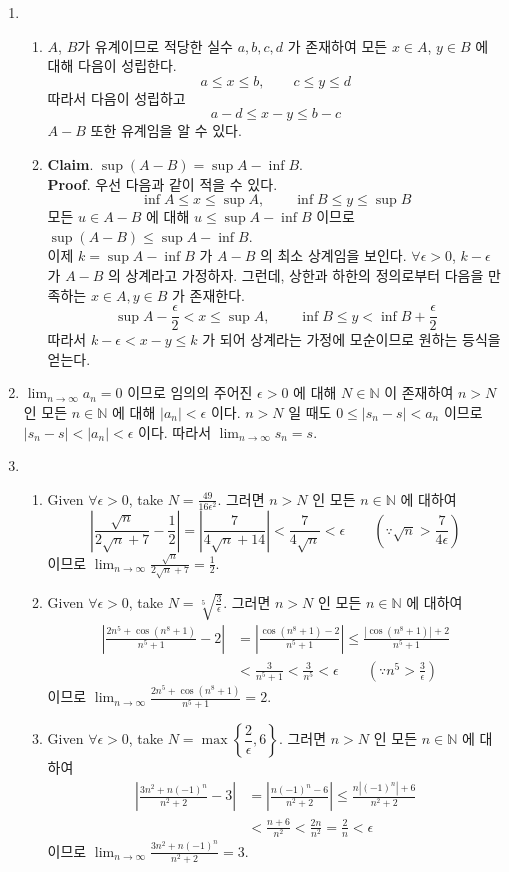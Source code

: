 \documentclass[12pt]{report}
\newcommand{\numl}[1]{\item[\large\textbf{\sffamily #1.}]}
\newcommand{\num}[1]{\item[\textbf{\sffamily #1}]}
\newcommand{\bb}[1]{\mathbb{#1}}
\newcommand{\ra}{\rightarrow}
\newcommand{\abs}[1]{\left|#1\right|}
\newcommand{\ds}{\displaystyle}
\begin{document}
\begin{enumerate}
\numl{3}
\begin{enumerate}
	\num{(1)} $A$, $B$가 유계이므로 적당한 실수 $a, b, c, d$ 가 존재하여 모든 $x \in A$, $y\in B$ 에 대해 다음이 성립한다. $$a\leq x\leq b, \qquad c\leq y\leq d$$ 따라서 다음이 성립하고 $$a-d\leq x-y\leq b-c$$ $A-B$ 또한 유계임을 알 수 있다.
	\num{(2)} \textbf{Claim}. $\sup(A-B) = \sup A-\inf B$.\\ \textbf{Proof}. 우선 다음과 같이 적을 수 있다. $$\inf A\leq x\leq \sup A, \qquad \inf B\leq y\leq \sup B$$ 모든 $u \in A-B$ 에 대해 $u \leq \sup A - \inf B$ 이므로 $\sup(A-B) \leq \sup A - \inf B$.\\ 이제 $k = \sup A - \inf B$ 가 $A-B$ 의 최소 상계임을 보인다. $\forall \epsilon > 0$, $k - \epsilon$ 가 $A-B$ 의 상계라고 가정하자. 그런데, 상한과 하한의 정의로부터 다음을 만족하는 $x \in A, y \in B$ 가 존재한다. $$\sup A - \frac{\epsilon}{2} < x \leq \sup A, \qquad \inf B \leq y < \inf B + \frac{\epsilon}{2}$$ 따라서 $k - \epsilon < x-y \leq k$ 가 되어 상계라는 가정에 모순이므로 원하는 등식을 얻는다.
\end{enumerate}

\numl{4} $\ds \lim_{n \ra \infty} a_n = 0$ 이므로 임의의 주어진 $\epsilon > 0$ 에 대해 $N\in\bb{N}$ 이 존재하여 $n>N$ 인 모든 $n\in \bb{N}$ 에 대해 $\abs{a_n} < \epsilon$ 이다. $n>N$ 일 때도 $0\leq\abs{s_n-s} < a_n$ 이므로 $\abs{s_n-s} < \abs{a_n} <\epsilon$ 이다. 따라서 $\ds \lim_{n \ra \infty} s_n = s$.

\numl{5}
\begin{enumerate}
	\num{(1)} Given $\forall \epsilon > 0$, take $N = \ds \frac{49}{16\epsilon^2}$. 그러면 $n>N$ 인 모든 $n\in\bb{N}$ 에 대하여\\
	$$\abs{\frac{\sqrt{n}}{2\sqrt{n}+7} - \frac{1}{2}} = \abs{\frac{7}{4\sqrt{n}+14}} < \frac{7}{4\sqrt{n}} < \epsilon \qquad \left(\because \sqrt{n} > \frac{7}{4\epsilon}\right)$$
	이므로 $\ds \lim_{n \ra \infty} \frac{\sqrt{n}}{2\sqrt{n}+7} = \frac{1}{2}$.
	
	\num{(2)} Given $\forall \epsilon > 0$, take $N = \ds \sqrt[5]{\frac{3}{\epsilon}}$. 그러면 $n>N$ 인 모든 $n\in\bb{N}$ 에 대하여\\
	$$\begin{aligned}
		\abs{\frac{2n^5 +\cos(n^8 +1)}{n^5+1} - 2} &= \abs{\frac{\cos(n^8+1) - 2}{n^5+1}} \leq \frac{\abs{\cos(n^8+1)} + 2}{n^5+1} \\&< \frac{3}{n^5+1} < \frac{3}{n^5} < \epsilon \qquad \left(\because n^5 > \frac{3}{\epsilon}\right)
	\end{aligned}$$
	이므로 $\ds \lim_{n \ra \infty} \frac{2n^5 +\cos(n^8 +1)}{n^5+1} = 2$.
	\num{(3)} Given $\forall \epsilon > 0$, take $N = \max\left\{\dfrac{2}{\epsilon}, 6\right\}$. 그러면 $n>N$ 인 모든 $n\in\bb{N}$ 에 대하여\\
	$$\begin{aligned}
		\abs{\frac{3n^2+n(-1)^n}{n^2+2} - 3} &= \abs{\frac{n(-1)^n - 6}{n^2+2}} \leq \frac{n\abs{(-1)^n} + 6}{n^2+2} \\&< \frac{n+6}{n^2} < \frac{2n}{n^2} = \frac{2}{n} < \epsilon
	\end{aligned}$$
	이므로 $\ds \lim_{n \ra \infty} \frac{3n^2+n(-1)^n}{n^2+2} = 3$.
\end{enumerate}


\end{enumerate}
\end{document}
